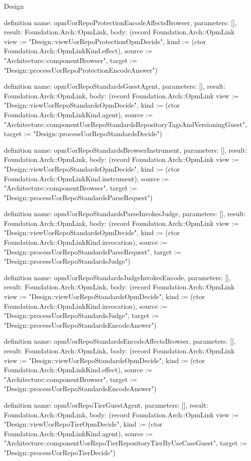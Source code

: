 \begin{lexlean}{Design}
\begin{semanticmodule}
definition{
  name: opmUorRepoProtectionEncodeAffectsBrowser,
  parameters: [],
  result: Foundation.Arch::OpmLink,
  body: (record Foundation.Arch::OpmLink {view := "Design::viewUorRepoProtectionOpmDecide", kind := (ctor Foundation.Arch::OpmLinkKind.effect), source := "Architecture::componentBrowser", target := "Design::processUorRepoProtectionEncodeAnswer"})
}

definition{
  name: opmUorRepoStandardsGuestAgent,
  parameters: [],
  result: Foundation.Arch::OpmLink,
  body: (record Foundation.Arch::OpmLink {view := "Design::viewUorRepoStandardsOpmDecide", kind := (ctor Foundation.Arch::OpmLinkKind.agent), source := "Architecture::componentUorRepoStandardsRepositoryTagsAndVersioningGuest", target := "Design::processUorRepoStandardsDecide"})
}

definition{
  name: opmUorRepoStandardsBrowserInstrument,
  parameters: [],
  result: Foundation.Arch::OpmLink,
  body: (record Foundation.Arch::OpmLink {view := "Design::viewUorRepoStandardsOpmDecide", kind := (ctor Foundation.Arch::OpmLinkKind.instrument), source := "Architecture::componentBrowser", target := "Design::processUorRepoStandardsParseRequest"})
}

definition{
  name: opmUorRepoStandardsParseInvokesJudge,
  parameters: [],
  result: Foundation.Arch::OpmLink,
  body: (record Foundation.Arch::OpmLink {view := "Design::viewUorRepoStandardsOpmDecide", kind := (ctor Foundation.Arch::OpmLinkKind.invocation), source := "Design::processUorRepoStandardsParseRequest", target := "Design::processUorRepoStandardsJudge"})
}

definition{
  name: opmUorRepoStandardsJudgeInvokesEncode,
  parameters: [],
  result: Foundation.Arch::OpmLink,
  body: (record Foundation.Arch::OpmLink {view := "Design::viewUorRepoStandardsOpmDecide", kind := (ctor Foundation.Arch::OpmLinkKind.invocation), source := "Design::processUorRepoStandardsJudge", target := "Design::processUorRepoStandardsEncodeAnswer"})
}

definition{
  name: opmUorRepoStandardsEncodeAffectsBrowser,
  parameters: [],
  result: Foundation.Arch::OpmLink,
  body: (record Foundation.Arch::OpmLink {view := "Design::viewUorRepoStandardsOpmDecide", kind := (ctor Foundation.Arch::OpmLinkKind.effect), source := "Architecture::componentBrowser", target := "Design::processUorRepoStandardsEncodeAnswer"})
}

definition{
  name: opmUorRepoTierGuestAgent,
  parameters: [],
  result: Foundation.Arch::OpmLink,
  body: (record Foundation.Arch::OpmLink {view := "Design::viewUorRepoTierOpmDecide", kind := (ctor Foundation.Arch::OpmLinkKind.agent), source := "Architecture::componentUorRepoTierRepositoryTierByUseCaseGuest", target := "Design::processUorRepoTierDecide"})
}


\end{semanticmodule}
\end{lexlean}
